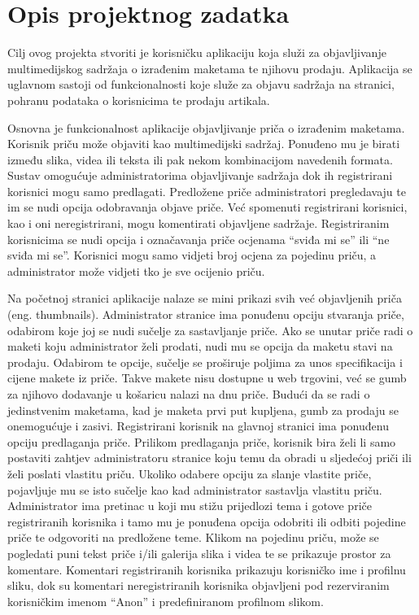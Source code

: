 \chapter{Opis projektnog zadatka}

		Cilj ovog projekta stvoriti je korisničku aplikaciju koja služi za objavljivanje multimedijskog sadržaja o izrađenim maketama te njihovu prodaju. Aplikacija se uglavnom sastoji od funkcionalnosti koje služe za objavu sadržaja na stranici, pohranu podataka o korisnicima te prodaju artikala.
		
		Osnovna je funkcionalnost aplikacije objavljivanje priča o izrađenim maketama. Korisnik priču može objaviti kao multimedijski sadržaj. Ponuđeno mu je birati između slika, videa ili teksta ili pak nekom kombinacijom navedenih formata. Sustav omogućuje administratorima objavljivanje sadržaja dok ih registrirani korisnici mogu samo predlagati. Predložene priče administratori pregledavaju te im se nudi opcija odobravanja objave priče. Već spomenuti registrirani korisnici, kao i oni neregistrirani, mogu komentirati objavljene sadržaje. Registriranim korisnicima se nudi opcija i označavanja priče ocjenama “sviđa mi se” ili “ne sviđa mi se”. Korisnici mogu samo vidjeti broj ocjena za pojedinu priču, a administrator može vidjeti tko je sve ocijenio priču.
		
		Na početnoj stranici aplikacije nalaze se mini prikazi svih već objavljenih priča (eng. thumbnails). Administrator stranice ima ponuđenu opciju stvaranja priče, odabirom koje joj se nudi sučelje za sastavljanje priče. Ako se unutar priče radi o maketi koju administrator želi prodati, nudi mu se opcija da maketu stavi na prodaju. Odabirom te opcije, sučelje se proširuje poljima za unos specifikacija i cijene makete iz priče. Takve makete nisu dostupne u web trgovini, već se gumb za njihovo dodavanje u košaricu nalazi na dnu priče. Budući da se radi o jedinstvenim maketama, kad je maketa prvi put kupljena, gumb za prodaju se onemogućuje i zasivi. Registrirani korisnik na glavnoj stranici ima ponuđenu opciju predlaganja priče. Prilikom predlaganja priče, korisnik bira želi li samo postaviti zahtjev administratoru stranice koju temu da obradi u sljedećoj priči ili želi poslati vlastitu priču. Ukoliko odabere opciju za slanje vlastite priče, pojavljuje mu se isto sučelje kao kad administrator sastavlja vlastitu priču. Administrator ima pretinac u koji mu stižu prijedlozi tema i gotove priče registriranih korisnika i tamo mu je ponuđena opcija odobriti ili odbiti pojedine priče te odgovoriti na predložene teme. Klikom na pojedinu priču, može se pogledati puni tekst priče i/ili galerija slika i videa te se prikazuje prostor za komentare. Komentari registriranih korisnika prikazuju korisničko ime i profilnu sliku, dok su komentari neregistriranih korisnika objavljeni pod rezerviranim korisničkim imenom “Anon” i predefiniranom profilnom slikom.
		
